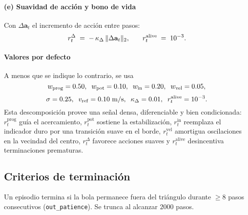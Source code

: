 \documentclass[conference]{IEEEtran}
\begin{document}
\paragraph{(e) Suavidad de acción y bono de vida}
Con $\Delta\mathbf{a}_t$ el incremento de acción entre pasos:
\begin{equation}
\small
r_t^{\Delta} \;=\; -\,\kappa_{\Delta}\,\lVert \Delta\mathbf{a}_t\rVert_2,
\qquad
r_t^{\mathrm{alive}} \;=\; 10^{-3}.
\end{equation}

\paragraph{Valores por defecto}
A menos que se indique lo contrario, se usa
\[
\small
w_{\mathrm{prog}}=0.50,\;\;
w_{\mathrm{pot}}=0.10,\;\;
w_{\mathrm{in}}=0.20,\;\;
w_{\mathrm{vel}}=0.05,
\]
\[
\small
\sigma=0.25,\;\;
v_{\mathrm{ref}}=0.10~\mathrm{m/s},\;\;
\kappa_{\Delta}=0.01,\;\;
r_t^{\mathrm{alive}}=10^{-3}.
\]
Esta descomposición provee una señal densa, diferenciable y bien condicionada: \(r_t^{\mathrm{prog}}\) guía el acercamiento, \(r_t^{\mathrm{pot}}\) sostiene la estabilización, \(r_t^{\mathrm{in}}\) reemplaza el indicador duro por una transición suave en el borde, \(r_t^{\mathrm{vel}}\) amortigua oscilaciones en la vecindad del centro, \(r_t^{\Delta}\) favorece acciones suaves y \(r_t^{\mathrm{alive}}\) desincentiva terminaciones prematuras.

\subsection{Criterios de terminación}
Un episodio termina si la bola permanece fuera del triángulo durante $\geq 8$ pasos consecutivos (\texttt{out\_patience}). Se trunca al alcanzar $2000$ pasos.
\end{document}
